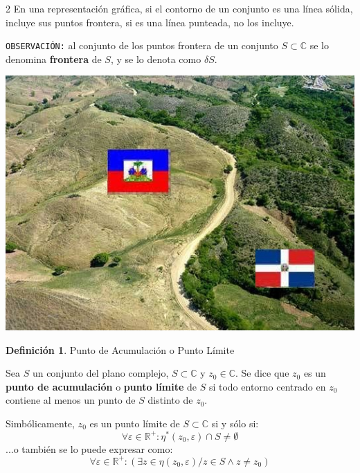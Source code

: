 \documentclass[12pt]{article}
\theoremstyle{definition}
\newtheorem{definition}{Definici\'on}[section]
\begin{document}
\begin{multicols} {2}	
En una representaci\'on gr\'afica, si el contorno de un conjunto es una l\'inea s\'olida, incluye sus puntos frontera, si es una l\'inea punteada, no los incluye.

	\texttt{OBSERVACI\'ON:} al conjunto de los puntos frontera de un conjunto $S \subset \mathbb{C}$ se lo denomina \textbf{frontera} de $S$, y se lo denota como $\delta S$.\\
	\linebreak
	
	\includegraphics[scale=0.4]{frontera.jpg}
\end{multicols}

\colorbox{yellow!40!white!80}{\parbox{\linewidth}{
\theoremstyle{definition}
\begin{definition} Punto de Acumulaci\'on o Punto L\'imite

Sea $S$ un conjunto del plano complejo, $S \subset \mathbb{C}$ y $z_0 \in \mathbb{C}$. Se dice que $z_0$ es un \textbf{punto de acumulaci\'on} o \textbf{punto l\'imite} de $S$ si todo entorno centrado en $z_0$ contiene al menos un punto de $S$ distinto de $z_0$.

Simb\'olicamente, $z_0$ es un punto l\'imite de $S \subset \mathbb{C}$ si y s\'olo si:
$$\forall \varepsilon \in \mathbb{R}^+ : \eta^*(z_0, \varepsilon) \cap S \neq \emptyset$$
...o tambi\'en se lo puede expresar como:
$$ \forall \varepsilon \in \mathbb{R}^+ : (\exists z \in \eta(z_0, \varepsilon) / z \in S \land z \neq z_0) $$
\end{definition}}}
\linebreak
\end{document}
